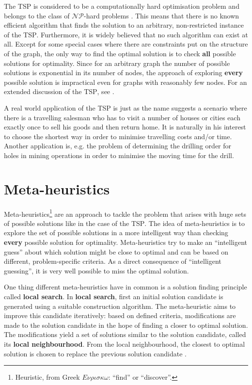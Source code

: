 
The \textsc{TSP} is considered to be a computationally hard optimisation problem and belongs to the class of $\mathcal{NP}$-hard problems \cite{Garey:1979:CIG:578533}. This means that there is no known efficient algorithm that finds the solution to an arbitrary, non-restricted instance of the \textsc{TSP}. Furthermore, it is widely believed that no such algorithm can exist at all. Except for some special cases where there are constraints put on the structure of the graph, the only way to find the optimal solution is to check \textbf{all} possible solutions for optimality. Since for an arbitrary graph the number of possible solutions is exponential in its number of nodes, the approach of exploring \textbf{every} possible solution is impractical even for graphs with reasonably few nodes. For an extended discussion of the \textsc{TSP}, see \cite{shmoys1985traveling}.

A real world application of the \textsc{TSP} is just as the name suggests a scenario where there is a travelling salesman who has to visit a number of houses or cities each exactly once to sell his goods and then return home. It is naturally in his interest to choose the shortest way in order to minimise travelling costs and/or time. Another application is, e.g. the problem of determining the drilling order for holes in mining operations in order to minimise the moving time for the drill.

\section{Meta-heuristics}
\label{chp:meta_heuristics}
Meta-heuristics\footnote{Heuristic, from Greek $E\nu\rho\iota\sigma\kappa\omega$: \enquote{find} or \enquote{discover}.} are an approach to tackle the problem that arises with huge sets of possible solutions like in the case of the \textsc{TSP}. The idea of meta-heuristics is to explore the set of possible solutions in a more intelligent way than checking \textbf{every} possible solution for optimality. Meta-heuristics try to make an \enquote{intelligent guess} about which solution might be close to optimal and can be based on different, problem-specific criteria. As a direct consequence of \enquote{intelligent guessing}, it is very well possible to miss the optimal solution.

One thing different meta-heuristics have in common is a solution finding principle called \textbf{local search}. In \textbf{local search}, first an initial solution candidate is generated using a suitable construction algorithm. The meta-heuristic aims to improve this candidate iteratively: based on defined criteria, modifications are made to the solution candidate in the hope of finding a closer to optimal solution. The modifications yield a set of solutions similar to the solution candidate, called its \textbf{local neighbourhood}. From the local neighbourhood, the closest to optimal solution is chosen to replace the previous solution candidate \cite{Dorigo:2004:ACO:975277}.

